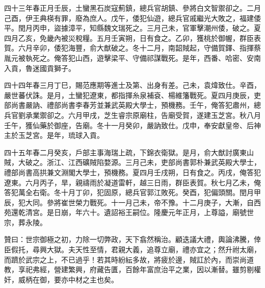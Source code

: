\begin{pinyinscope}
四十三年春正月壬辰，土蠻黑石炭寇薊鎮，總兵官胡鎮、參將白文智禦卻之。二月己酉，伊王典楧有罪，廢為庶人。戊午，倭犯仙遊，總兵官戚繼光大敗之，福建倭平。閏月丙申，盜據漳平，知縣魏文瑞死之。三月己未，官軍擊潮州倭，破之。夏四月乙亥，免畿內被災稅糧。五月壬寅朔，日有食之。乙卯，獲桃於御幄，群臣表賀。六月辛卯，倭犯海豐，俞大猷破之。冬十二月，南韶賊起，守備賀鐸、指揮蔡胤元被執死之。俺答犯山西，遊擊梁平、守備祁謀戰死。是年，西番、哈密、安南入貢，魯迷國貢獅子。

四十四年春三月丁巳，賜范應期等進士及第、出身有差。己未，袁煒致仕。辛酉，嚴世蕃伏誅。是月，土蠻犯遼東，都指揮糸泉補袞、楊維籓戰死。夏四月庚辰，吏部尚書嚴訥、禮部尚書李春芳並兼武英殿大學士，預機務。壬午，俺答犯肅州，總兵官劉承業禦卻之。六月甲戌，芝生睿宗原廟柱，告廟受賀，遂建玉芝宮。秋八月壬午，獲仙藥於御座，告廟。冬十一月癸卯，嚴訥致仕。戊申，奉安獻皇帝、后神主於玉芝宮。是年，琉球入貢。

四十五年春二月癸亥，戶部主事海瑞上疏，下錦衣衛獄。是月，俞大猷討廣東山賊，大破之。浙江、江西礦賊陷婺源。三月己未，吏部尚書郭朴兼武英殿大學士，禮部尚書高拱兼文淵閣大學士，預機務。夏四月壬戌朔，日有食之。丙戌，俺答犯遼東。六月丙子，旱，親禱雨於凝道雷軒，越三日雨，群臣表賀。秋七月乙未，俺答犯萬全右衛。冬十月丁卯，犯固原，總兵官郭江敗死。癸酉，犯偏頭關。閏月甲辰，犯大同。參將崔世榮力戰死。十一月己未，帝不豫。十二月庚子，大漸，自西苑還乾清宮。是日崩，年六十。遺詔裕王嗣位。隆慶元年正月，上尊謚，廟號世宗，葬永陵。

贊曰：世宗御極之初，力除一切弊政，天下翕然稱治。顧迭議大禮，輿論沸騰，倖臣假托，尋興大獄。夫天性至情，君親大義，追尊立廟，禮亦宜之；然升祔太廟，而躋於武宗之上，不已過乎！若其時紛紜多故，將疲於邊，賊訌於內，而崇尚道教，享祀弗經，營建繁興，府藏告匱，百餘年富庶治平之業，因以漸替。雖剪剔權奸，威柄在御，要亦中材之主也矣。



\end{pinyinscope}